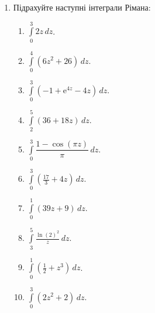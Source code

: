 \begin{enumerate}
\item Підрахуйте наступні інтеграли Рімана:
    \begin{enumerate}[label*=\arabic*.]
        \item $\int\limits_0^3 2z \,dz$.
        \item $\int\limits_0^4 \left({6} {z^{2}}{+}{26}\right) \,dz$.
        \item $\int\limits_0^3 \left(-1+{\mathrm e}^{4 z}-4z\right) \,dz$.
        \item $\int\limits_2^5 \left(36 + 18 z\right) \,dz$.
        \item $\int\limits_0^3 \dfrac{1 - \cos\! \left(\pi  z\right)}{\pi} \,dz$.
        \item $\int\limits_0^3\left(\frac{17}{3}+4 z\right) \,dz$.
        \item $\int\limits_0^1 \left({39} {z}{+}{9}\right) \,dz$.
        \item $\int\limits_3^5 \frac{\ln\! \left(2\right)^{2}}{z} \,dz$.
        \item $\int\limits_0^1 \left(\frac{1}{2}+z^{3}\right) \,dz$.
        \item $\int\limits_0^3 \left({2} {z^{2}}{+}{2}\right) \,dz$.
        \end{enumerate}
\end{enumerate}
